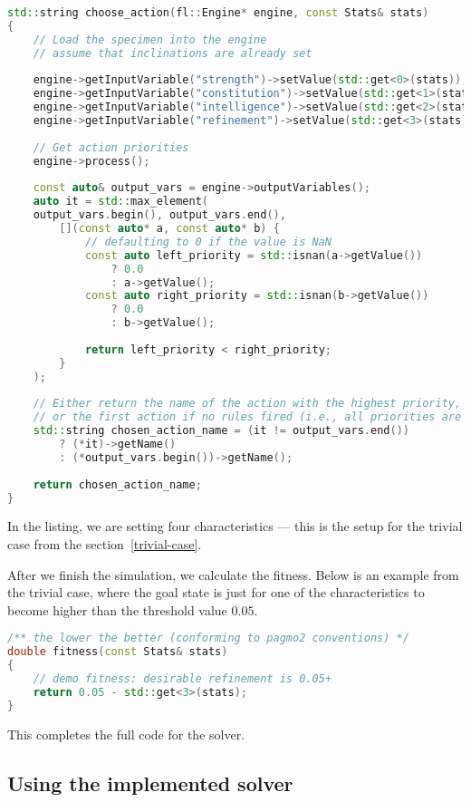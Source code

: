 \documentclass[12pt, a4paper]{article}
\begin{document}
	\begin{lstlisting}[language=c++]
std::string choose_action(fl::Engine* engine, const Stats& stats)
{
	// Load the specimen into the engine
	// assume that inclinations are already set
	
	engine->getInputVariable("strength")->setValue(std::get<0>(stats));
	engine->getInputVariable("constitution")->setValue(std::get<1>(stats));
	engine->getInputVariable("intelligence")->setValue(std::get<2>(stats));
	engine->getInputVariable("refinement")->setValue(std::get<3>(stats));
	
	// Get action priorities
	engine->process();
	
	const auto& output_vars = engine->outputVariables();
	auto it = std::max_element(
	output_vars.begin(), output_vars.end(),
		[](const auto* a, const auto* b) {
			// defaulting to 0 if the value is NaN
			const auto left_priority = std::isnan(a->getValue()) 
				? 0.0 
				: a->getValue();
			const auto right_priority = std::isnan(b->getValue()) 
				? 0.0 
				: b->getValue();
			
			return left_priority < right_priority;
		}
	);
	
	// Either return the name of the action with the highest priority,
	// or the first action if no rules fired (i.e., all priorities are 0).
	std::string chosen_action_name = (it != output_vars.end())
		? (*it)->getName()
		: (*output_vars.begin())->getName();
	
	return chosen_action_name;
}
	\end{lstlisting}

	In the listing, we are setting four characteristics --- this is the setup for the trivial case from the section~\ref{trivial-case}.
		
	After we finish the simulation, we calculate the fitness.
	Below is an example from the trivial case, where the goal state is just for one of the characteristics to become higher than the threshold value $0.05$.
	
	\begin{lstlisting}[language=c++]
/** the lower the better (conforming to pagmo2 conventions) */
double fitness(const Stats& stats)
{
	// demo fitness: desirable refinement is 0.05+
	return 0.05 - std::get<3>(stats);
}
	\end{lstlisting}

	This completes the full code for the solver.
	
	\subsection{Using the implemented solver}
	
\end{document}
